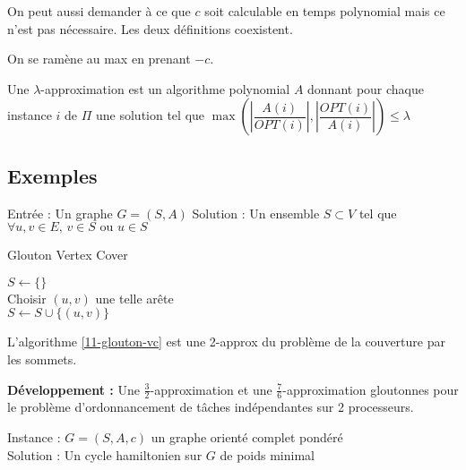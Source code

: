 \begin{com}
	On peut aussi demander à ce que $c$ soit calculable en temps polynomial mais ce n'est pas nécessaire. Les deux définitions coexistent.
\end{com}

\begin{rem}
	On se ramène au max en prenant $-c$.
\end{rem}

\begin{definition}
	    Une $\lambda$-approximation est un algorithme polynomial $A$ donnant pour chaque instance $i$ de $\Pi$ une solution tel que $\max\left(\left| \dfrac{A(i)}{OPT(i)} \right|, \left| \dfrac{OPT(i)}{A(i)} \right|\right) \leq \lambda$
\end{definition}

\subsection{Exemples}

\begin{definition}
	Entrée : Un graphe $G = (S, A)$
	Solution : Un ensemble $S \subset V$ tel que $\forall u, v \in E, \,v\in S \text{ ou } u \in S$
\end{definition}

\begin{algorithm}[H]
	\label{11-glouton-vc}
	\caption{Glouton Vertex Cover}
	$S \gets \{\}$\\
	{
		Choisir $(u,v)$ une telle arête\\
		$S \gets S \cup \{(u,v)\}$
	}
\end{algorithm}

\begin{proposition}
	L'algorithme \ref{11-glouton-vc} est une 2-approx du problème de la couverture par les sommets.
\end{proposition}



\noindent \textbf{Développement :} Une $\frac{3}{2}$-approximation et une $\frac{7}{6}$-approximation gloutonnes pour le problème d'ordonnancement de tâches indépendantes sur 2 processeurs.



\begin{definition}
	Instance : $G = (S, A, c)$ un graphe orienté complet pondéré\\
	Solution : Un cycle hamiltonien sur $G$ de poids minimal
\end{definition}

